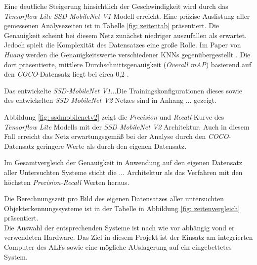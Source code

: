 

Eine deutliche Steigerung hinsichtlich der Geschwindigkeit wird durch das \textit{Tensorflow Lite SSD MobileNet V1} Modell erreicht. Eine präzise Auslistung aller gemessenen Analysezeiten ist in Tabelle \ref{fig: zeitentab} präsentiert. Die Genauigkeit scheint bei diesem Netz zunächst niedriger auszufallen als erwartet. Jedoch spielt die Komplexität des Datensatzes eine große Rolle. Im Paper von \textit{Huang} werden die Genauigkeitswerte verschiedener KNNs gegenübergestellt \cite{maxssdmobilenet}. Die dort präsentierte, mittlere Durchschnittsgenauigkeit (\textit{Overall mAP}) basierend auf den \textit{COCO}-Datensatz liegt bei circa 0,2 \cite{maxssdmobilenet}. 



Das entwickelte \textit{SSD-MobileNet V1}...Die Trainingskonfigurationen dieses sowie des entwickelten \textit{SSD MobileNet V2} Netzes sind in Anhang ... gezeigt.



Abbildung \ref{fig: ssdmobilenetv2} zeigt die \textit{Precision} und \textit{Recall} Kurve des \textit{Tensorflow Lite} Modells mit der \textit{SSD MobileNet V2} Architektur. Auch in diesem Fall erreicht das Netz erwartungsgemäß bei der Analyse durch den \textit{COCO}-Datensatz geringere Werte als durch den eigenen Datensatz. 

   



Im Gesamtvergleich der Genauigkeit in Anwendung auf den eigenen Datensatz aller Untersuchten Systeme sticht die ... Architektur als das Verfahren mit den höchsten \textit{Precision-Recall} Werten heraus. 



Die Berechnungszeit pro Bild des eigenen Datensatzes aller untersuchten Objekterkennungssysteme ist in der Tabelle in Abbildung \ref{fig: zeitenvergleich} präsentiert. \\

Die Auswahl der entsprechenden Systeme ist nach wie vor abhängig vond er verwendeten Hardware. Das Ziel in diesem Projekt ist der Einsatz am integrierten Computer des ALFs sowie eine mögliche AUslagerung auf ein eingebettetes System. 



